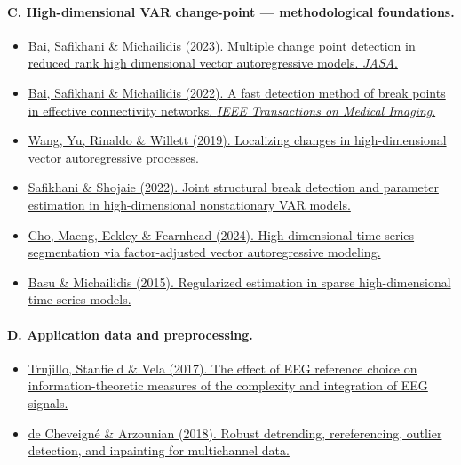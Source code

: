 \documentclass[11pt]{article}
\begin{document}
\paragraph{C. High-dimensional VAR change-point --- methodological foundations.}
\begin{itemize}
    \item \href{https://doi.org/10.1080/01621459.2022.2079514}{Bai, Safikhani \& Michailidis (2023). Multiple change point detection in reduced rank high dimensional vector autoregressive models. \emph{JASA}.} \cite{bai2023multiple}
    \item \href{https://doi.org/10.1109/TMI.2021.3129205}{Bai, Safikhani \& Michailidis (2022). A fast detection method of break points in effective connectivity networks. \emph{IEEE Transactions on Medical Imaging}.} \cite{bai2022fast}
    \item \href{https://arxiv.org/abs/1909.06359}{Wang, Yu, Rinaldo \& Willett (2019). Localizing changes in high-dimensional vector autoregressive processes.} \cite{wang2019localizing}
    \item \href{https://doi.org/10.1080/01621459.2020.1770097}{Safikhani \& Shojaie (2022). Joint structural break detection and parameter estimation in high-dimensional nonstationary VAR models.} \cite{safikhani2020joint}
    \item \href{https://doi.org/10.1080/01621459.2023.2240054}{Cho, Maeng, Eckley \& Fearnhead (2024). High-dimensional time series segmentation via factor-adjusted vector autoregressive modeling.} \cite{cho2023high}
    \item \href{https://doi.org/10.1214/15-AOS1315}{Basu \& Michailidis (2015). Regularized estimation in sparse high-dimensional time series models.} \cite{basu2015regularized}
\end{itemize}

\paragraph{D. Application data and preprocessing.}
\begin{itemize}
    \item \href{https://doi.org/10.3389/fnins.2017.00425}{Trujillo, Stanfield \& Vela (2017). The effect of EEG reference choice on information-theoretic measures of the complexity and integration of EEG signals.} \cite{trujillo2017effect}
    \item \href{https://doi.org/10.1016/j.neuroimage.2018.01.035}{de Cheveign\'e \& Arzounian (2018). Robust detrending, rereferencing, outlier detection, and inpainting for multichannel data.} \cite{de2018robust}
\end{itemize}
\end{document}
